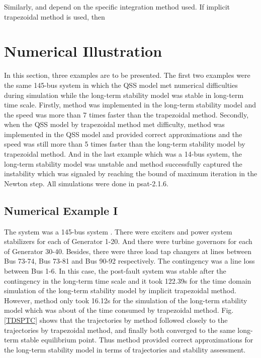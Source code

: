\documentclass[journal]{IEEEtran}
\begin{document}
Similarly,  and  depend on the specific integration method used. If implicit trapezoidal method is used, then




\section{Numerical Illustration}\label{sectionnumerical}
In this section, three examples are to be presented. The first two examples were the same 145-bus system in which the QSS model met numerical difficulties during simulation while the long-term stability model was stable in long-term time scale. Firstly,  method was implemented in the long-term stability model and the speed was more than 7 times faster than the trapezoidal method. Secondly, when the QSS model by trapezoidal method met difficulty,  method was implemented in the QSS model and provided correct approximations and the speed was still more than 5 times faster than the long-term stability model by trapezoidal method. And in the last example which was a 14-bus system, the long-term stability model was unstable and  method successfully captured the instability which was signaled by reaching the bound of maximum iteration in the Newton step. All simulations were done in psat-2.1.6\cite{Milano:article}.

\subsection{Numerical Example I}\label{qss_numerical}
The system was a 145-bus system \cite{Vittal:article}. There were exciters and power system stabilizers for each of Generator 1-20. And there were turbine governors for each of Generator 30-40. Besides, there were three load tap changers at lines between Bus 73-74, Bus 73-81 and Bus 90-92 respectively. The contingency was a line loss between Bus 1-6.
In this case, the post-fault system was stable after the contingency in the long-term time scale and it took 122.39s for the time domain simulation of the long-term stability model by implicit trapezoidal method. However,  method only took 16.12s for the simulation of the long-term stability model which was about  of the time consumed by trapezoidal method. Fig. \ref{TDSPTC} shows that the trajectories by  method followed closely to the trajectories by trapezoidal method, and finally both converged to the same long-term stable equilibrium point. Thus  method provided correct approximations for the long-term stability model in terms of trajectories and stability assessment.
\end{document}

